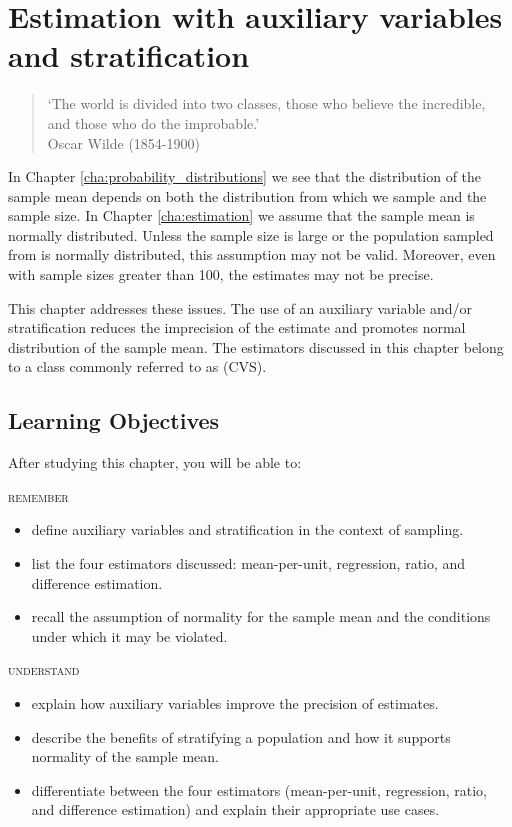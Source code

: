 \chapter{Estimation with auxiliary variables and stratification} %
\label{cha:stratified_sampling}

\begin{quote}
`The world is divided into two classes, those who believe the incredible, and those who do the improbable.'\\
Oscar Wilde (1854-1900)
\end{quote}


In Chapter \ref{cha:probability_distributions} we see that the distribution of the sample mean depends on both the distribution from which we sample and the sample size. In Chapter \ref{cha:estimation} we assume that the sample mean is normally distributed. Unless the sample size is large or the population sampled from is normally distributed, this assumption may not be valid. Moreover, even with sample sizes greater than 100, the estimates may not be precise.

This chapter addresses these issues. The use of an auxiliary variable and/or stratification reduces the imprecision of the estimate and promotes normal distribution of the sample mean. The estimators discussed in this chapter belong to a class commonly referred to as  (CVS).

\section*{Learning Objectives}

After studying this chapter, you will be able to:

\bigskip
\noindent \textsc{remember}

\begin{itemize}

\item define auxiliary variables and stratification in the context of sampling.
\item list the four estimators discussed: mean-per-unit, regression, ratio, and difference estimation.
\item recall the assumption of normality for the sample mean and the conditions under which it may be violated.
\end{itemize}

\noindent \textsc{understand}
\begin{itemize}

\item explain how auxiliary variables improve the precision of estimates.
\item describe the benefits of stratifying a population and how it supports normality of the sample mean.
\item differentiate between the four estimators (mean-per-unit, regression, ratio, and difference estimation) and explain their appropriate use cases.
\end{itemize}

